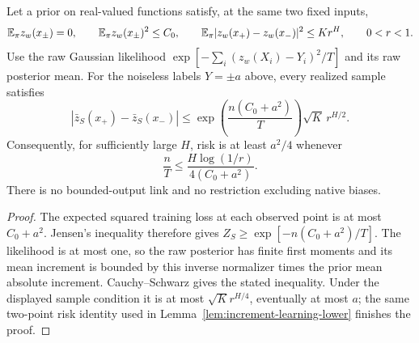 \begin{proposition}
\label{prop:raw-increment-depth-lower}
Let a prior on real-valued functions satisfy, at the same two fixed inputs,
\[
 \mathbb E_\pi z_w(x_\pm)=0,\qquad
 \mathbb E_\pi z_w(x_\pm)^2\le C_0,\qquad
 \mathbb E_\pi|z_w(x_+)-z_w(x_-)|^2\le K r^H,
 \qquad 0<r<1.
\]
Use the raw Gaussian likelihood
$\exp[-\sum_i(z_w(X_i)-Y_i)^2/T]$ and its raw posterior mean.
For the noiseless labels $Y=\pm a$ above, every realized sample satisfies
\[
 |\bar z_S(x_+)-\bar z_S(x_-)|
 \le \exp\!\left(\frac{n(C_0+a^2)}{T}\right)\sqrt K\,r^{H/2}.
\]
Consequently, for sufficiently large $H$, risk is at least $a^2/4$
whenever
\[
 \frac nT\le
 \frac{H\log(1/r)}{4(C_0+a^2)}.
\]
There is no bounded-output link and no restriction excluding native biases.
\end{proposition}
\begin{proof}
The expected squared training loss at each observed point is at most
$C_0+a^2$. Jensen's inequality therefore gives
$Z_S\ge\exp[-n(C_0+a^2)/T]$.
The likelihood is at most one, so the raw posterior has finite first
moments and its mean increment is bounded by this inverse normalizer
times the prior mean absolute increment. Cauchy--Schwarz gives the stated
inequality. Under the displayed sample condition it is at most
$\sqrt K r^{H/4}$, eventually at most $a$; the same two-point risk identity
used in Lemma~\ref{lem:increment-learning-lower} finishes the proof.
\end{proof}

